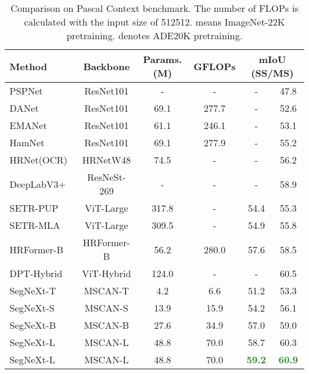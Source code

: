 \documentclass{article}
\begin{document}
\begin{table}[!t]\centering
\renewcommand{\arraystretch}{1}
\renewcommand{\tabcolsep}{3mm}
\small
\caption{Comparison on Pascal Context benchmark.
    	The number of FLOPs is calculated with the input size of 512512. 
    	 means ImageNet-22K pretraining.
    	 denotes ADE20K pretraining.}
\begin{tabular}{l|c|c|c|cc}
\toprule
	Method & Backbone & Params.(M) & GFLOPs & \multicolumn{2}{c}{mIoU (SS/MS)}  \\
	\midrule
	PSPNet~\cite{zhao2017pyramid} & ResNet101 & - & - & - & 47.8  \\ 
	DANet~\cite{fu2019dual} & ResNet101 & 69.1 & 277.7 & - & 52.6  \\ 
    EMANet~\cite{li2019expectation} & ResNet101 & 61.1 & 246.1 & - & 53.1  \\ 
	HamNet~\cite{geng2021attention} & ResNet101 & 69.1 &  277.9 & - & 55.2  \\ 
	HRNet(OCR)~\cite{wang2020deep} & HRNetW48 & 74.5 & - & - & 56.2  \\ 
	DeepLabV3+~\cite{chen2018encoder} & ResNeSt-269 & - & - & - & 58.9  \\ 
	SETR-PUP~\cite{zheng2021rethinking} & ViT-Large & 317.8 & -  & 54.4 & 55.3  \\ 
	SETR-MLA~\cite{zheng2021rethinking} & ViT-Large & 309.5 & - & 54.9 & 55.8  \\ 
	HRFormer-B~\cite{yuan2021hrformer} & HRFormer-B  & 56.2 & 280.0 & 57.6 & 58.5  \\ 
	DPT-Hybrid~\cite{ranftl2021vision} & ViT-Hybrid & 124.0 & - & - & 60.5  \\ 
	\midrule
    SegNeXt-T & MSCAN-T & 4.2 & 6.6 & 51.2 & 53.3  \\ 
    SegNeXt-S & MSCAN-S & 13.9 & 15.9 &  54.2 & 56.1 \\ 
	SegNeXt-B & MSCAN-B & 27.6 & 34.9 & 57.0 & 59.0 \\ 
	SegNeXt-L & MSCAN-L & 48.8 & 70.0 & 58.7 & 60.3  \\ \specialrule{0em}{0pt}{-1pt}
	SegNeXt-L & MSCAN-L & 48.8 & 70.0 &
	\textbf{\textcolor{ForestGreen}{59.2}} & \textbf{\textcolor{ForestGreen}{60.9}}  \\ 
\bottomrule
\end{tabular}
\label{tab:pascal_context}
\end{table}
\end{document}
